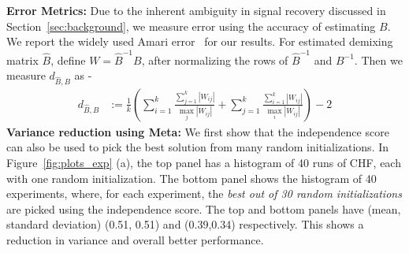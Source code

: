 \documentclass[letterpaper]{article}
\newcommand{\ba}[1]{\begin{align}#1\end{align}}
\newcommand{\bb}[1]{\left(#1\right)}
\begin{document}
\textbf{Error Metrics:} Due to the inherent ambiguity in signal recovery discussed in Section~\ref{sec:background}, we measure error using the accuracy of estimating $B$. %
We report the widely used Amari error~\cite{amari1995new,hastie2002ICA,chen2005ICA,chen2006ICA} for our results. For estimated demixing matrix $\widehat{B}$, define $W = \widehat{B}^{-1}B$, after normalizing the rows of $\widehat{B}^{-1}$ and $B^{-1}$. Then we measure $d_{\widehat{B}, B}$ as - 
\ba{\label{eq:amari_error}
    d_{\widehat{B}, B}&:= \frac{1}{k}\bb{\sum_{i=1}^{k}\frac{\sum_{j=1}^{k}|W_{ij}|}{\max_{j}|W_{ij}|} + \sum_{j=1}^{k}\frac{\sum_{i=1}^{k}|W_{ij}|}{\max_{i}|W_{ij}|}} - 2 
}
\textbf{Variance reduction using Meta:} We first show that the independence score can also be used to pick the best solution from many random initializations. In Figure~\ref{fig:plots_exp} (a), the top panel has a histogram of 40 runs of CHF, each with one random initialization. The bottom panel shows the histogram of 40 experiments, where, for each experiment, the \textit{best out of 30 random initializations} are picked using the independence score. The top and bottom panels have (mean, standard deviation) (0.51, 0.51) and (0.39,0.34) respectively.  This shows a reduction in variance and overall better performance. 
\end{document}
